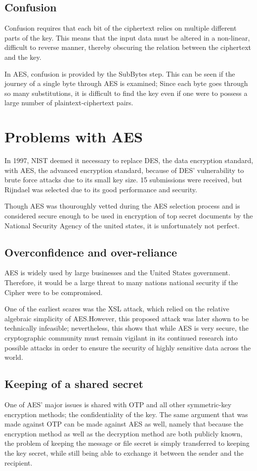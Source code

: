 \documentclass[12pt]{report}
\theoremstyle{definition}
\theoremstyle{remark}
\begin{document}
\subsection{Confusion}
Confusion requires that each bit of the ciphertext relies on multiple different parts of the key. This means that the input data must be altered in a non-linear, difficult to reverse manner, thereby obscuring the relation between the ciphertext and the key\cite{Confusion}.

In AES, confusion is provided by the SubBytes step. This can be seen if the journey of a single byte through AES is examined; Since each byte goes through so many substitutions, it is difficult to find the key even if one were to possess a large number of plaintext-ciphertext pairs.

\section{Problems with AES}
In 1997, NIST deemed it necessary to replace DES, the data encryption standard, with AES, the advanced encryption standard, because of DES' vulnerability to brute force attacks due to its small key size. 15 submissions were received, but Rijndael was selected due to its good performance and security\cite{AESSelection}.

Though AES was thouroughly vetted during the AES selection process and is considered secure enough to be used in encryption of top secret documents by the National Security Agency\cite{CNSSPolicy} of the united states, it is unfortunately not perfect.

\subsection{Overconfidence and over-reliance}
AES is widely used by large businesses and the United States government. Therefore, it would be a large threat to many nations national security if the Cipher were to be compromised.

One of the earliest scares was the XSL attack, which relied on the relative algebraic simplicity of AES\cite{XSL}.However, this proposed attack was later shown to be technically infeasible\cite{XLSRebuked}; nevertheless, this shows that while AES is very secure, the cryptographic community must remain vigilant in its continued research into possible attacks in order to ensure the security of highly sensitive data across the world.

\subsection{Keeping of a shared secret}
One of AES' major issues is shared with OTP and all other symmetric-key encryption methods; the confidentiality of the key. The same argument that was made against OTP can be made against AES as well, namely that because the encryption method as well as the decryption method are both publicly known, the problem of keeping the message or file secret is simply transferred to keeping the key secret, while still being able to exchange it between the sender and the recipient.
\end{document}
